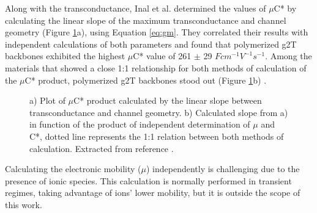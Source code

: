 Along with the transconductance, Inal et al. determined the values of $\mu$C* by calculating the linear slope of the maximum transconductance and channel geometry (Figure \ref{fig:gmuc}a), using Equation \ref{eq:gm}. They correlated their results with independent calculations of both parameters and found that polymerized g2T backbones exhibited the highest $\mu$C* value of 261 $\pm$ 29 $Fcm^{-1}V^{-1}s^{-1}$. Among the materials that showed a close 1:1 relationship for both methods of calculation of the $\mu$C* product, polymerized g2T backbones stood out (Figure \ref{fig:gmuc}b) \cite{inalBenchmarkingOrganicMixed2017}.
 
 \begin{figure}[ht]
 	\centering
 	\hspace{2em}
 	\caption[OECTs benchmark with different OMIECs]{a) Plot of $\mu$C* product calculated by the linear slope between transconductance and channel geometry. b) Calculated slope from a) in function of the product of independent determination of $\mu$ and C*, dotted line represents the 1:1 relation between both methods of calculation. Extracted from reference %
 		\cite{inalBenchmarkingOrganicMixed2017}.}
 	\label{fig:gmuc}
 \end{figure}

Calculating the electronic mobility ($\mu$) independently is challenging due to the presence of ionic species. This calculation is normally performed in transient regimes, taking advantage of ions' lower mobility, but it is outside the scope of this work. 

